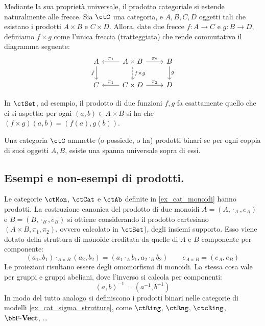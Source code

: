 \medskip	
Mediante la sua proprietà universale, il prodotto categoriale si estende naturalmente alle frecce. Sia \(\ctC\) una categoria, e \(A,B,C,D\) oggetti tali che esistano i prodotti \(A\times B\) e \(C\times D\). Allora, date due frecce \(f\colon A\to C\) e \(g\colon B\to D\), definiamo \(f\times g\) come l'unica freccia (tratteggiata) che rende commutativo il diagramma seguente:
\begin{equation}
	\begin{aligned}
\begin{tikzcd}
	A\ar[d, "f"']&A\times B\ar[l, "\pi_1"']\ar[r, "\pi_2"]\ar[d, "f\times g", dashed]&B\ar[d, "g"]
	\\
	C&C\times D\ar[l, "\pi_1"']\ar[r, "\pi_2"]&D
\end{tikzcd}
	\end{aligned}
\end{equation}

In \(\ctSet\), ad esempio, il prodotto di due funzioni \(f,g\) fa esattamente quello che ci si aspetta: per ogni \((a,b)\in A\times B\) si ha che \((f\times g)(a,b)=(f(a),g(b))\).

\begin{definition}\label{def_cat_con_prodotti}
	Una categoria \(\ctC\) ammette (o possiede, o ha) prodotti binari se per ogni coppia di suoi oggetti \(A,B\), esiste una spanna universale sopra di essi.
\end{definition}

\subsection{Esempi e non-esempi di prodotti.}
\begin{example}  
	Le categorie \(\ctMon\), \(\ctCat\) e \(\ctAb\) definite in \ref{ex_cat_monoidi} hanno prodotti. La costruzione canonica del prodotto di due monoidi \(A=(A, \cdot_A, e_A)\) e \(B=(B, \cdot_B, e_B)\)   si ottiene considerando il prodotto cartesiano \((A\times B,\pi_1, \pi_2)\), ovvero calcolato in \(\ctSet\)), degli insiemi supporto. Esso viene dotato della struttura di monoide ereditata da quelle di \(A\) e \(B\) componente per componente:
	\[
	(a_1,b_1)\cdot_{A \times B} (a_2,b_2)=(a_1\cdot_A b_1, a_2\cdot_B b_2)\qquad e_{A\times B}=(e_A,e_B)
	\]
	Le proiezioni risultano essere degli omomorfismi di monoidi.
	La stessa cosa vale per gruppi e gruppi abeliani, dove l'inverso si calcola per componenti: 
	\[
	(a,b)^{-1}=(a^{-1},b^{-1})
	\]
	In modo del tutto analogo si definiscono i prodotti binari nelle categorie di modelli  \ref{ex_cat_sigma_strutture}, come \(\ctRing\), \(\ctRng\), \(\ctcRing\), \(\ctVect\), \dots 
\end{example}


